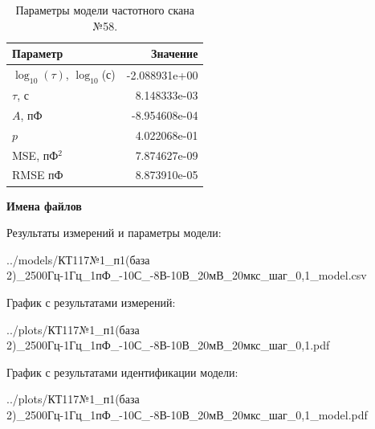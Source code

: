 \begin{table}[!ht]
    \centering
    \caption{Параметры модели частотного скана №58.}
    \begin{tabular}{|l|r|}
        \hline
        Параметр                                       & Значение                  \\ \hline
        $\log_{10}(\tau)$, $\log_{10}$(с)              & -2.088931e+00             \\ \hline
        $\tau$, с                                      & 8.148333e-03              \\ \hline
        $A$, пФ                                        & -8.954608e-04             \\ \hline
        $p$                                            & 4.022068e-01              \\ \hline
        MSE, пФ$^2$                                    & 7.874627e-09              \\ \hline
        RMSE пФ                                        & 8.873910e-05              \\ \hline
    \end{tabular}
    \label{table:frequency_scan_model_58}
\end{table}

\textbf{Имена файлов}

Результаты измерений и параметры модели:

\scriptsize../models/КТ117№1\_п1(база 2)\_2500Гц-1Гц\_1пФ\_-10С\_-8В-10В\_20мВ\_20мкс\_шаг\_0,1\_model.csv
\normalsize

График с результатами измерений:

\scriptsize../plots/КТ117№1\_п1(база 2)\_2500Гц-1Гц\_1пФ\_-10С\_-8В-10В\_20мВ\_20мкс\_шаг\_0,1.pdf
\normalsize

График с результатами идентификации модели:

\scriptsize../plots/КТ117№1\_п1(база 2)\_2500Гц-1Гц\_1пФ\_-10С\_-8В-10В\_20мВ\_20мкс\_шаг\_0,1\_model.pdf
\normalsize

